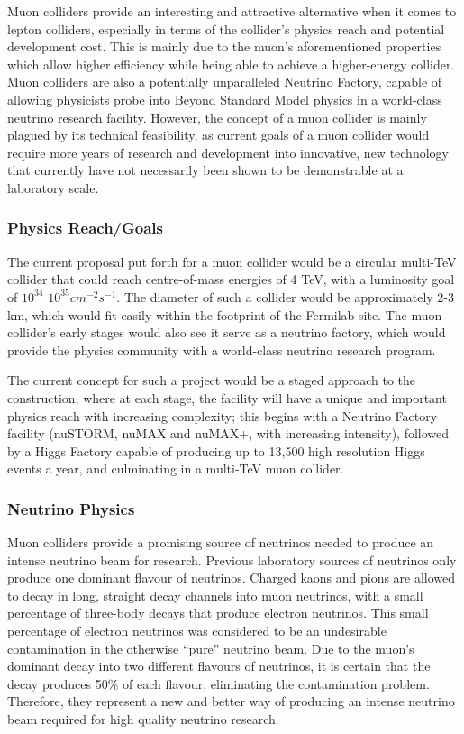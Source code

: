 Muon colliders provide an interesting and attractive alternative when it comes to lepton colliders, especially in terms of the collider's physics reach and potential development cost. This is mainly due to the muon's aforementioned properties which allow higher efficiency while being able to achieve a higher-energy collider. Muon colliders are also a potentially unparalleled Neutrino Factory, capable of allowing physicists probe into Beyond Standard Model physics in a world-class neutrino research facility. However, the concept of a muon collider is mainly plagued by its technical feasibility, as current goals of a muon collider would require more years of research and development into innovative, new technology that currently have not necessarily been shown to be demonstrable at a laboratory scale.
 
\subsubsection{Physics Reach/Goals}
 
The current proposal put forth for a muon collider would be a circular multi-TeV collider that could reach centre-of-mass energies of 4 TeV, with a luminosity goal of $10^{34}$ \textendash $10^{35} cm^{-2} s^{-1}$. The diameter of such a collider would be approximately 2-3 km, which would fit easily within the footprint of the Fermilab site. The muon collider's early stages would also see it serve as a neutrino factory, which would provide the physics community with a world-class neutrino research program.
 
The current concept for such a project would be a staged approach to the construction, where at each stage, the facility will have a unique and important physics reach with increasing complexity; this begins with a Neutrino Factory facility (nuSTORM, nuMAX and nuMAX+, with increasing intensity), followed by a Higgs Factory capable of producing up to 13,500 high resolution Higgs events a year, and culminating in a multi-TeV muon collider.
 
\subsubsection{Neutrino Physics}
 
Muon colliders provide a promising source of neutrinos needed to produce an intense neutrino beam for research. Previous laboratory sources of neutrinos only produce one dominant flavour of neutrinos. Charged kaons and pions are allowed to decay in long, straight decay channels into muon neutrinos, with a small percentage of three-body decays that produce electron neutrinos. This small percentage of electron neutrinos was considered to be an undesirable contamination in the otherwise “pure” neutrino beam. Due to the muon's dominant decay into two different flavours of neutrinos, it is certain that the decay produces 50\% of each flavour, eliminating the contamination problem. Therefore, they represent a new and better way of producing an intense neutrino beam required for high quality neutrino research.
 
